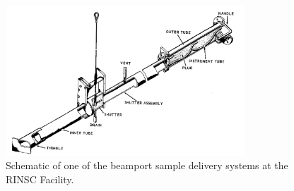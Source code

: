 \begin{figure}[!hbt]
  \begin{center}
    \includegraphics[width=0.80\textwidth]{figures/Beamport_Schematic}
    \caption{Schematic of one of the beamport sample delivery systems at the RINSC Facility.}
    \label{fig:Beamport_Schematic}
  \end{center}
\end{figure}

\fi       %
